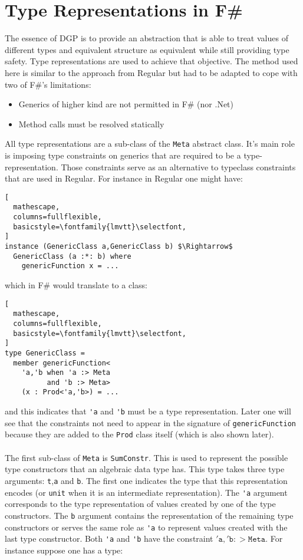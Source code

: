 \documentclass{sigplanconf}
\begin{document}
\section{Type Representations in F\#}
The essence of DGP is to provide an abstraction that is able to treat values of different types and equivalent structure as equivalent while still providing type safety. Type representations are used to achieve that objective. The method used here is similar to the approach from Regular\cite{Regular} but had to be adapted to cope with two of F\#'s limitations:
\begin{itemize}
\item Generics of higher kind are not permitted in F\# (nor .Net)
\item Method calls must be resolved statically
\end{itemize}
All type representations are a sub-class of the \verb+Meta+ abstract class. It's main role is imposing type constraints on generics that are required to be a type-representation. Those constraints serve as an alternative to typeclass constraints that are used in Regular. For instance in Regular one might have:
\begin{lstlisting}[
  mathescape,
  columns=fullflexible,
  basicstyle=\fontfamily{lmvtt}\selectfont,
]
instance (GenericClass a,GenericClass b) $\Rightarrow$
  GenericClass (a :*: b) where
    genericFunction x = ...
\end{lstlisting}
which in F\# would translate to a class:
\begin{lstlisting}[
  mathescape,
  columns=fullflexible,
  basicstyle=\fontfamily{lmvtt}\selectfont,
]
type GenericClass =
  member genericFunction<
    'a,'b when 'a :> Meta 
          and 'b :> Meta> 
    (x : Prod<'a,'b>) = ...
\end{lstlisting}
and this indicates that \verb+'a+ and \verb+'b+ must be a type representation. Later one will see that the constraints not need to appear in the signature of \verb+genericFunction+ because they are added to the \verb+Prod+ class itself (which is also shown later).
\\\\
The first sub-class of \verb+Meta+ is \verb+SumConstr+. This is used to represent the possible type constructors that an algebraic data type has. This type takes three type arguments: \verb+t+,\verb+a+ and \verb+b+. The first one indicates the type that this representation encodes (or \verb+unit+ when it is an intermediate representation). The \verb+'a+ argument corresponds to the type representation of values created by one of the type constructors. The \verb+b+ argument contains the representation of the remaining type constructors or serves the same role as \verb+'a+ to represent values created with the last type constructor. Both \verb+'a+ and \verb+'b+ have the constraint $\mathtt{'a},\mathtt{'b} :> \mathtt{Meta}$. For instance suppose one has a type:
\end{document}
